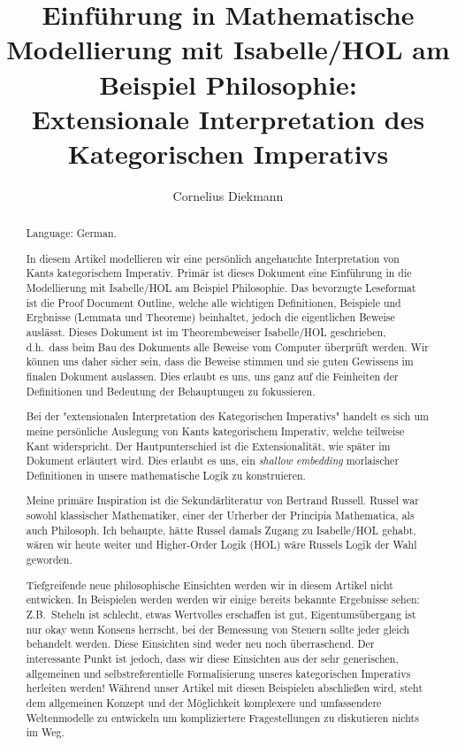 \documentclass[11pt,a4paper]{article}
\begin{document}
\title{Einführung in Mathematische Modellierung mit Isabelle/HOL am Beispiel Philosophie:\\
Extensionale Interpretation des Kategorischen Imperativs}
\author{Cornelius Diekmann}
\maketitle

\begin{abstract}

Language: German.

\medskip

In diesem Artikel modellieren wir eine persönlich angehauchte
Interpretation von Kants kategorischem Imperativ.
Primär ist dieses Dokument eine Einführung in die Modellierung mit Isabelle/HOL
am Beispiel Philosophie.
Das bevorzugte Leseformat ist die Proof Document Outline,
welche alle wichtigen Definitionen, Beispiele und Ergbnisse (Lemmata und Theoreme) beinhaltet,
jedoch die eigentlichen Beweise auslässt.
Dieses Dokument ist im Theorembeweiser Isabelle/HOL geschrieben,
d.h.\ dass beim Bau des Dokuments alle Beweise vom Computer überprüft werden.
Wir können uns daher sicher sein, dass die Beweise stimmen
und sie guten Gewissens im finalen Dokument auslassen.
Dies erlaubt es uns, uns ganz auf die Feinheiten der Definitionen
und Bedeutung der Behauptungen zu fokussieren.


Bei der "extensionalen Interpretation des Kategorischen Imperativs" handelt es sich
um meine persönliche Auslegung von Kants kategorischem Imperativ,
welche teilweise Kant widerspricht.
Der Hautpunterschied ist die Extensionalität, wie später im Dokument erläutert wird.
Dies erlaubt es uns, ein \emph{shallow embedding} morlaischer Definitionen in
unsere mathematische Logik zu konstruieren.

Meine primäre Inspiration ist die Sekundärliteratur von Bertrand Russell.
Russel war sowohl klassischer Mathematiker, einer der Urherber der Principia Mathematica,
als auch Philosoph.
Ich behaupte, hätte Russel damals Zugang zu Isabelle/HOL gehabt, wären wir heute weiter
und Higher-Order Logik (HOL) wäre Russels Logik der Wahl geworden.

Tiefgreifende neue philosophische Einsichten werden wir in diesem Artikel nicht entwicken.
In Beispielen werden werden wir einige bereits bekannte Ergebnisse sehen:
Z.B.\ Steheln ist schlecht, etwas Wertvolles erschaffen ist gut,
Eigentumsübergang ist nur okay wenn Konsens herrscht,
bei der Bemessung von Steuern sollte jeder gleich behandelt werden.
Diese Einsichten sind weder neu noch überraschend.
Der interessante Punkt ist jedoch,
dass wir diese Einsichten aus der sehr generischen, allgemeinen und selbstreferentielle Formalisierung
unseres kategorischen Imperativs herleiten werden!
Während unser Artikel mit diesen Beispielen abschließen wird,
steht dem allgemeinen Konzept und der Möglichkeit komplexere
und umfassendere Weltenmodelle zu entwickeln um kompliziertere Fragestellungen zu diskutieren
nichts im Weg.
\end{abstract}
\end{document}
